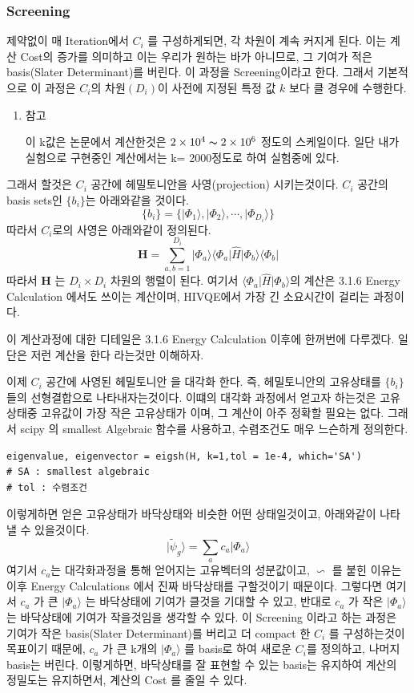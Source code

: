 \documentclass[11pt]{article}
\begin{document}
\subsubsection{Screening}
제약없이 매 Iteration에서 \(C_i\) 를 구성하게되면, 각 차원이 계속 커지게 된다. 이는 계산 Cost의 증가를 의미하고 이는 우리가 원하는 바가 아니므로, 그 기여가 적은 basis(Slater Determinant)를 버린다. 이 과정을 Screening이라고 한다. 
그래서 기본적으로 이 과정은 \(C_i\)의 차원\(\left(D_{i}\right)\)이 사전에 지정된 특정 값 \(k\) 보다 클 경우에 수행한다. 
\begin{enumerate}[label=\(\ast\)]
\item {참고}

이 k값은 논문에서 계산한것은 \(2 \times 10^{4} \thicksim  2 \times 10^{6}\) 정도의 스케일이다. 일단 내가 실험으로 구현중인 계산에서는 k= 2000정도로 하여 실험중에 있다. 
\end{enumerate}
그래서 할것은 \(C_i\) 공간에 헤밀토니안을 사영(projection) 시키는것이다. 
\(C_i\) 공간의 basis sets인 \(\{b_i\}\)는 아래와같을 것이다. 
\[
\{b_i\} = \{\vert \Phi_1 \rangle, \vert \Phi_2 \rangle, \cdots, \vert \Phi_{D_i} \rangle \}
\]
따라서 \(C_i\)로의 사영은 아래와같이 정의된다. 
\[
\mathbf{H} = \sum_{a,b=1}^{D_i} \vert \Phi_a \rangle \langle \Phi_a \vert \hat{H} \vert \Phi_b \rangle \langle \Phi_b \vert
\]
따라서 \(\mathbf{H}\) 는 \(D_i \times D_i \) 차원의 행렬이 된다. 
여기서 \(\langle \Phi_a \vert \hat{H} \vert \Phi_b \rangle\)의 계산은 3.1.6 Energy Calculation 에서도 쓰이는 계산이며,
HIVQE에서 가장 긴 소요시간이 걸리는 과정이다. 

이 계산과정에 대한 디테일은 3.1.6 Energy Calculation 이후에 한꺼번에 다루겠다. 일단은 저런 계산을 한다 라는것만 이해하자. 

이제 \(C_i\) 공간에 사영된 헤밀토니안 을 대각화 한다. 즉, 헤밀토니안의 고유상태를 \(\{b_i\}\) 들의 선형결합으로 나타내자는것이다. 
이떄의 대각화 과정에서 얻고자 하는것은 고유상태중 고유값이 가장 작은 고유상태가 이며, 그 계산이 아주 정확할 필요는 없다. 그래서 scipy 의 smallest Algebraic 함수를 사용하고, 수렴조건도 매우 느슨하게 정의한다. 
\begin{lstlisting}[style=pythonstyle]
eigenvalue, eigenvector = eigsh(H, k=1,tol = 1e-4, which='SA')  
# SA : smallest algebraic
# tol : 수렴조건
\end{lstlisting}
이렇게하면 얻은 고유상태가 바닥상태와 비슷한 어떤 상태일것이고, 아래와같이 나타낼 수 있을것이다.
\[
\vert \tilde{\psi}_g \rangle = \sum_{a} c_a \vert \Phi_a \rangle 
\]
여기서 \(c_a\)는 대각화과정을 통해 얻어지는 고유벡터의 성분값이고, \(\backsim\) 를 붙힌 이유는 이후 Energy Calculations 에서 진짜 바닥상태를 구할것이기 때문이다. 
그렇다면 여기서 \(c_a\) 가 큰 \(\vert \Phi_a \rangle \) 는 바닥상태에 기여가 클것을 기대할 수 있고, 
반대로 \(c_a\) 가 작은 \(\vert \Phi_a \rangle \) 는 바닥상태에 기여가 작을것임을 생각할 수 있다.
이 Screening 이라고 하는 과정은 기여가 작은 basis(Slater Determinant)를 버리고 더 compact 한 \(C_i\) 를 구성하는것이 목표이기 때문에,
\(c_a\) 가 큰 k개의 \(\vert \Phi_a \rangle \) 를 basis로 하여 새로운 \(C_i\)를 정의하고, 나머지 basis는 버린다. 이렇게하면, 바닥상태를 잘 표현할 수 있는 basis는 유지하여
계산의 정밀도는 유지하면서, 계산의 Cost 를 줄일 수 있다. 
\end{document}
